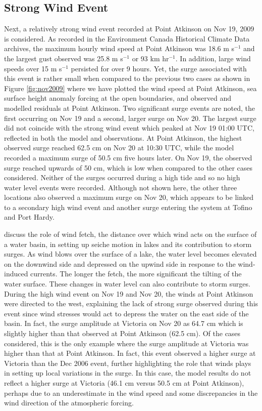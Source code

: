 \documentclass[pdftex,10pt]{article}
\begin{document}
\subsection{Strong Wind Event}
Next, a relatively strong wind event recorded at Point Atkinson on Nov 19, 2009 is considered. As recorded in the Environment Canada Historical Climate Data archives, the maximum hourly wind speed at Point Atkinson was 18.6 m s$^{-1}$ and the largest gust observed was 25.8 m s$^{-1}$ or 93 km hr$^{-1}$. In addition, large wind speeds over 15 m s$^{-1}$ persisted for over 9 hours. Yet, the surge associated with this event is rather small when compared to the previous two cases as shown in Figure \ref{fig:nov2009} where we have plotted the wind speed at Point Atkinson, sea surface height anomaly forcing at the open boundaries, and observed and modelled residuals at Point Atkinson. Two significant surge events are noted, the first occurring on Nov 19 and a second, larger surge on Nov 20. The largest surge did not coincide with the strong wind event which peaked at Nov 19 01:00 UTC, reflected in both the model and observations. At Point Atkinson, the highest observed surge reached 62.5 cm on Nov 20 at 10:30 UTC, while the model recorded a maximum surge of 50.5 cm five hours later. On Nov 19, the observed surge reached upwards of 50 cm, which is low when compared to the other cases considered. Neither of the surges occurred during a high tide and so no high water level events were recorded. Although not shown here, the other three locations also observed a maximum surge on Nov 20, which appears to be linked to a secondary high wind event and another surge entering the system at Tofino and Port Hardy. 

\citet{danard2003storm} discuss the role of wind fetch, the distance over which wind acts on the surface of a water basin, in setting up seiche motion in lakes and its contribution to storm surges. As wind blows over the surface of a lake, the water level becomes elevated on the downwind side and depressed on the upwind side in response to the wind-induced currents. The longer the fetch, the more significant the tilting of the water surface. These changes in water level can also contribute to storm surges.  During the high wind event on Nov 19 and Nov 20, the winds at Point Atkinson were directed to the west, explaining the lack of strong surge observed during this event since wind stresses would act to depress the water on the east side of the basin. In fact, the surge amplitude at Victoria on Nov 20 as 64.7 cm which is slightly higher than that observed at Point Atkinson (62.5 cm). Of the cases considered, this is the only example where the surge amplitude at Victoria was higher than that at Point Atkinson. In fact, this event observed a higher surge at Victoria than the Dec 2006 event, further highlighting the role that winds plays in setting up local variations in the surge. In this case, the model results do not reflect a higher surge at Victoria (46.1 cm versus 50.5 cm at Point Atkinson), perhaps due to an underestimate in the wind speed and some discrepancies in the wind direction of the atmospheric forcing.  
\end{document}
